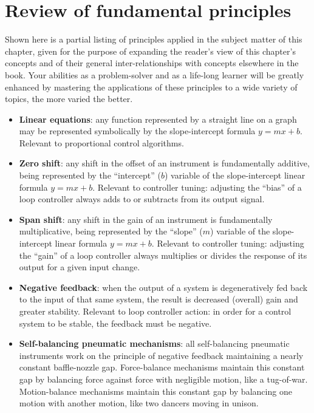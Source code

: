 \filbreak
\section{Review of fundamental principles}

Shown here is a partial listing of principles applied in the subject matter of this chapter, given for the purpose of expanding the reader's view of this chapter's concepts and of their general inter-relationships with concepts elsewhere in the book.  Your abilities as a problem-solver and as a life-long learner will be greatly enhanced by mastering the applications of these principles to a wide variety of topics, the more varied the better.

\begin{itemize}
\item \textbf{Linear equations}: any function represented by a straight line on a graph may be represented symbolically by the slope-intercept formula $y = mx + b$.  Relevant to proportional control algorithms.
\item \textbf{Zero shift}: any shift in the offset of an instrument is fundamentally additive, being represented by the ``intercept'' ($b$) variable of the slope-intercept linear formula $y = mx + b$.  Relevant to controller tuning: adjusting the ``bias'' of a loop controller always adds to or subtracts from its output signal.
\item \textbf{Span shift}: any shift in the gain of an instrument is fundamentally multiplicative, being represented by the ``slope'' ($m$) variable of the slope-intercept linear formula $y = mx + b$.  Relevant to controller tuning: adjusting the ``gain'' of a loop controller always multiplies or divides the response of its output for a given input change.
\item \textbf{Negative feedback}: when the output of a system is degeneratively fed back to the input of that same system, the result is decreased (overall) gain and greater stability.  Relevant to loop controller action: in order for a control system to be stable, the feedback must be negative.
\item \textbf{Self-balancing pneumatic mechanisms}: all self-balancing pneumatic instruments work on the principle of negative feedback maintaining a nearly constant baffle-nozzle gap.  Force-balance mechanisms maintain this constant gap by balancing force against force with negligible motion, like a tug-of-war.  Motion-balance mechanisms maintain this constant gap by balancing one motion with another motion, like two dancers moving in unison.

\end{itemize}
